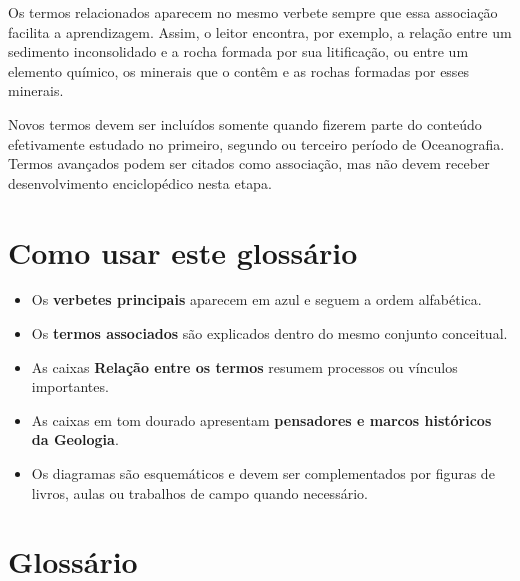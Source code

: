 \documentclass[11pt,a4paper,twoside,openany]{book}
\newcommand{\notaescopo}[1]{%
  \begin{tcolorbox}[
    colback=white,
    colframe=uerjred,
    title={Nota de escopo},
    fonttitle=\sffamily\bfseries,
    boxrule=0.55pt,
    arc=1mm
  ]
  #1
  \end{tcolorbox}
}%
\begin{document}
Os termos relacionados aparecem no mesmo verbete sempre que essa associação facilita a aprendizagem. Assim, o leitor encontra, por exemplo, a relação entre um sedimento inconsolidado e a rocha formada por sua litificação, ou entre um elemento químico, os minerais que o contêm e as rochas formadas por esses minerais.

\notaescopo{Novos termos devem ser incluídos somente quando fizerem parte do conteúdo efetivamente estudado no primeiro, segundo ou terceiro período de Oceanografia. Termos avançados podem ser citados como associação, mas não devem receber desenvolvimento enciclopédico nesta etapa.}

\chapter*{Como usar este glossário}

\begin{itemize}
  \item Os \textbf{verbetes principais} aparecem em azul e seguem a ordem alfabética.
  \item Os \textbf{termos associados} são explicados dentro do mesmo conjunto conceitual.
  \item As caixas \textbf{Relação entre os termos} resumem processos ou vínculos importantes.
  \item As caixas em tom dourado apresentam \textbf{pensadores e marcos históricos da Geologia}.
  \item Os diagramas são esquemáticos e devem ser complementados por figuras de livros, aulas ou trabalhos de campo quando necessário.
\end{itemize}

\tableofcontents

\mainmatter
\chapter*{Glossário}
\end{document}
